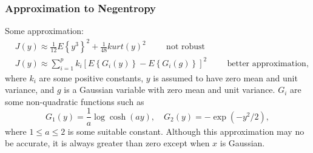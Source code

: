 \documentclass{article}
\begin{document}
\subsubsection{Approximation to Negentropy}
Some approximation:
\begin{align*}
&J(y) \approx \frac{1}{12} E\left\{y^{3}\right\}^{2}+\frac{1}{48} k u r t(y)^{2} \hspace{1cm}\text{not robust}\\
&J(y) \approx \sum_{i=1}^{p} k_{i}\left[E\left\{G_{i}(y)\right\}-E\left\{G_{i}(g)\right\}\right]^{2} \hspace{1cm}\text{better approximation},
\end{align*}
where $k_i$ are some positive constants, $y$ is assumed to have zero mean and unit variance, and $g$ is a Gaussian variable with zero mean and unit variance. $G_i$ are some non-quadratic functions such as 
\begin{equation}
G_{1}(y)=\frac{1}{a} \log \cosh (a y), \quad G_{2}(y)=-\exp \left(-y^{2} / 2\right),
\end{equation}
where $1 \leq a \leq 2$ is some suitable constant. Although this approximation may no be accurate, it is always greater than zero except when $x$ is Gaussian. 
\end{document}
